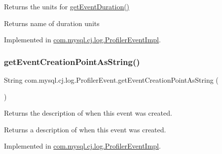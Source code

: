 Returns the units for \mbox{\hyperlink{interfacecom_1_1mysql_1_1cj_1_1log_1_1_profiler_event_a82728ebce7920e4a0096f8135ec8336b}{get\+Event\+Duration()}}

\begin{DoxyReturn}{Returns}
name of duration units 
\end{DoxyReturn}


Implemented in \mbox{\hyperlink{classcom_1_1mysql_1_1cj_1_1log_1_1_profiler_event_impl_a412e4b084f1c75d2ce0043bef41c2647}{com.\+mysql.\+cj.\+log.\+Profiler\+Event\+Impl}}.

\mbox{\label{interfacecom_1_1mysql_1_1cj_1_1log_1_1_profiler_event_a839ab93561623274644822815bbaf71f}} 
\subsubsection{\texorpdfstring{get\+Event\+Creation\+Point\+As\+String()}{getEventCreationPointAsString()}}
{\footnotesize\ttfamily String com.\+mysql.\+cj.\+log.\+Profiler\+Event.\+get\+Event\+Creation\+Point\+As\+String (\begin{DoxyParamCaption}{ }\end{DoxyParamCaption})}

Returns the description of when this event was created.

\begin{DoxyReturn}{Returns}
a description of when this event was created. 
\end{DoxyReturn}


Implemented in \mbox{\hyperlink{classcom_1_1mysql_1_1cj_1_1log_1_1_profiler_event_impl_aadc8269b69fc66e1c421d5a18e834ceb}{com.\+mysql.\+cj.\+log.\+Profiler\+Event\+Impl}}.

\mbox{\label{interfacecom_1_1mysql_1_1cj_1_1log_1_1_profiler_event_aaadc6536f2576ccdc026fe5ad1d01ff0}} 
